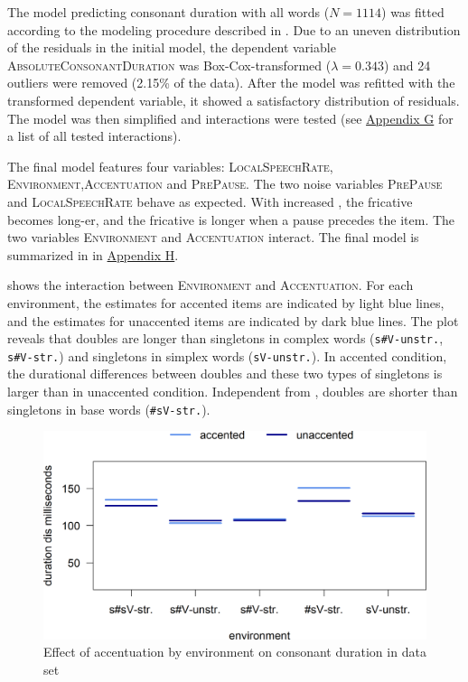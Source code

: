 The model predicting consonant duration with all words ($N=1114$) was fitted according to the modeling procedure described in . Due to an uneven distribution of the residuals in the initial model, the dependent variable \textsc{AbsoluteConsonantDuration} was Box-Cox-transformed ($\lambda = 0.343$) and 24 outliers were removed (2.15\% of the data). After the model was refitted with the transformed dependent variable, it showed a satisfactory distribution of residuals.  The model was then simplified and interactions were tested (see \hyperref[Appendix G Summaries of tested interactions in experimental study]{Appendix G} for a list of all tested interactions). 

The final model features four variables: \textsc{LocalSpeechRate}, \textsc{Environment},\linebreak\textsc{Accentuation} and \textsc{PrePause}. The two noise variables \textsc{PrePause} and \textsc{LocalSpeechRate} behave as expected. With increased , the fricative becomes long-er, and the fricative is longer when a pause precedes the item.
 The two variables \textsc{Environment} and \textsc{Accentuation} interact. The final model is summarized in  in \hyperref[Appendix H: Model Summaries Experiment]{Appendix H}.




 shows the interaction between \textsc{Environment} and \textsc{Accentuation}. For each environment, the estimates for accented items are indicated by light blue lines, and the estimates for unaccented items are indicated by dark blue lines.
The plot reveals that doubles are longer than singletons in complex words (\texttt{s\#V-unstr.}, \texttt{s\#V-str.}) and singletons in simplex words (\texttt{sV-unstr.}). In accented condition, the durational differences between doubles and these two types of singletons is larger than in unaccented condition. 
Independent from , doubles are shorter than singletons in base words (\texttt{\#sV-str.}).


\begin{figure}
	
	\includegraphics [scale=0.5] {images/Experiment/disModelCompleteinterEnvAcc}
	\caption{Effect of accentuation by environment on consonant duration in data set}
	\label{fig:  dis experiment Env and accent}
\end{figure}


